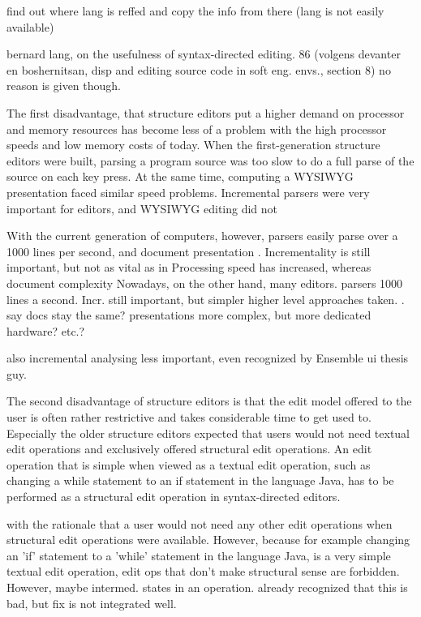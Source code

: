 find out where lang is reffed and copy the info from there (lang is not easily available)

 bernard lang, on the usefulness of syntax-directed editing. 86 (volgens devanter en boshernitsan, disp and editing source code in soft eng. envs., section 8)
 no reason is given though.




The first disadvantage, that structure editors put a higher demand on processor and memory resources has become less of a problem with the high processor speeds and low memory costs of today. When the first-generation structure editors were built, parsing a program source was too slow to do a full parse of the source on each key press. At the same time, computing a WYSIWYG presentation faced similar speed problems. Incremental parsers were very important for editors, and WYSIWYG editing did not 

With the current generation of computers, however, parsers easily parse over a 1000 lines per second, and document presentation . Incrementality is still important, but not as vital as in %
Processing speed has increased, whereas document complexity Nowadays, on the other hand, many editors. parsers 1000 lines a second. Incr. still important, but simpler higher level approaches taken. 
. say docs stay the same? presentations more complex, but more dedicated hardware? etc.?

also incremental analysing less important, even recognized by Ensemble ui thesis guy.


The second disadvantage of structure editors is that the edit model offered to the user is often rather restrictive and takes considerable time to get used to. Especially the older structure editors expected that users would not need textual edit operations and exclusively offered structural edit operations. An edit operation that is simple when viewed as a textual edit operation, such as changing a while statement to an if statement in the language Java, has to be performed as a structural edit operation in syntax-directed editors. 

 with the rationale that a user would not need any other edit operations when structural edit operations were available. However, because for example changing an 'if' statement to a 'while' statement in the language Java, is a very simple textual edit operation, 
edit ops that don't make structural sense are forbidden. However, maybe intermed. states in an operation. 
already recognized that this is bad, but fix is not integrated well.

